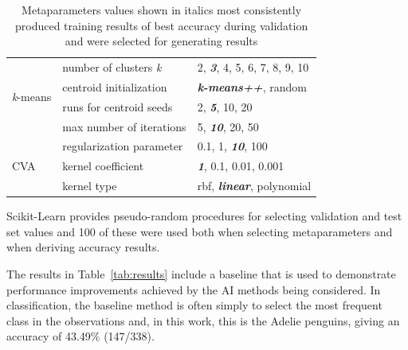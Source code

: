 \documentclass[12pt]{article}
\begin{document}
\begin{table}
\begin{center}
\begin{tabular}{l|l|l}
  \hline
  \multirow{4}{*}{\textit{k}-means} & number of clusters \textit{k}  & 2, \textit{\textbf{3}}, 4, 5, 6, 7, 8, 9, 10 \\
                                    & centroid initialization         & \textit{\textbf{k-means++}}, random \\
                                    & runs for centroid seeds	     & 2, \textit{\textbf{5}}, 10, 20 \\
                                    & max number of iterations           & 5, \textit{\textbf{10}}, 20, 50 \\
  \hline
    \multirow{3}{*}{CVA}            & regularization parameter  & 0.1, 1, \textit{\textbf{10}}, 100 \\
                                    & kernel coefficient      & \textit{\textbf{1}}, 0.1, 0.01, 0.001 \\
                                    & kernel type                  & rbf, \textit{\textbf{linear}}, polynomial \\
  \hline
  \end{tabular}
  \vspace{-1.5\baselineskip} %
  \end{center} 
  \caption{\centering\linespread{0.8}\selectfont Metaparameters values shown in italics most consistently produced training results of 
  best accuracy during validation and were selected for generating results}
  \vspace{-1\baselineskip} %
  \label{tab:metaparameters}
\end{table} 

Scikit-Learn provides pseudo-random procedures for selecting validation and test set values and 100 of these were used 
both when selecting metaparameters and when deriving accuracy results.

The results in Table~\ref{tab:results} include a baseline that is used to demonstrate performance improvements achieved by the AI methods being considered. 
In classification, the baseline method is often simply to select the most frequent class in the observations and, 
in this work, this is the Adelie penguins, giving an accuracy of 43.49\% (147/338).
\end{document}
